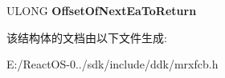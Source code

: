 \begin{DoxyCompactItemize}
\begin{tabbing}
\end{tabbing}\item 
\mbox{\label{struct___m_r_x___f_o_b_x___a4f7bf596f69d7130a8fcb0f9b947797c}} 
U\+L\+O\+NG {\bfseries Offset\+Of\+Next\+Ea\+To\+Return}
\end{DoxyCompactItemize}


该结构体的文档由以下文件生成\+:\begin{DoxyCompactItemize}
\item 
E\+:/\+React\+O\+S-\/0../sdk/include/ddk/mrxfcb.\+h\end{DoxyCompactItemize}
